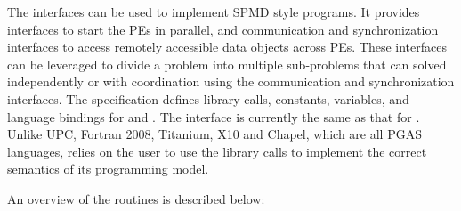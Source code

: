 
The \openshmem{} interfaces can be used to implement \ac{SPMD} style programs. It provides interfaces to start the \openshmem{} \ac{PE}s in parallel, and communication and synchronization interfaces to access remotely accessible data objects across \ac{PE}s. These interfaces can be leveraged to divide a problem into multiple sub-problems that can solved independently or with coordination using the communication and synchronization interfaces.
The \openshmem specification defines library calls, constants, variables, and language bindings for \Clang{} and \Fortran{}.
The \Cpp{} interface is currently the same as that for \Clang. Unlike UPC, Fortran 2008, Titanium, X10 and Chapel, which are all PGAS languages, \openshmem relies on 
the user to use the library calls  to implement the correct semantics of its programming model.

An overview of the \openshmem routines is described below:


